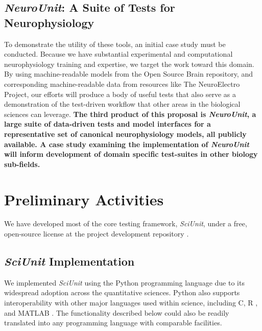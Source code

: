 \documentclass[11pt,letterpaper]{article}
\begin{document}
\subsection{\textit{NeuroUnit}: A Suite of Tests for Neurophysiology}\label{sec:neurounit}
To demonstrate the utility of these tools, an initial case study must be conducted. Because we have substantial experimental and computational neurophysiology training and expertise, we target the work toward this domain. By using machine-readable models from the Open Source Brain repository, and corresponding machine-readable data from resources like The NeuroElectro Project, our efforts will produce a body of useful tests that also serve as a demonstration of the test-driven workflow that other areas in the biological sciences can leverage.  \textbf{The third product of this proposal is \textit{NeuroUnit}, a large suite of data-driven tests and model interfaces for a representative set of canonical neurophysiology models, all publicly available. A case study examining the implementation of \textit{NeuroUnit} will inform development of domain specific test-suites in other biology sub-fields.}

\section{Preliminary Activities}
We have developed most of the core testing framework, \textit{SciUnit}, under a free, open-source license at the project development repository \cite{sciunit_url}.  

\subsection{\textit{SciUnit} Implementation} We implemented \textit{SciUnit} using the Python programming language \cite{python} due to its widespread adoption across the quantitative sciences. Python also supports interoperability with other major languages used within science, including C, R \cite{r_url}, and MATLAB \cite{matlab_url}. The functionality described below could also be readily translated into any programming language with comparable facilities.
\end{document}
